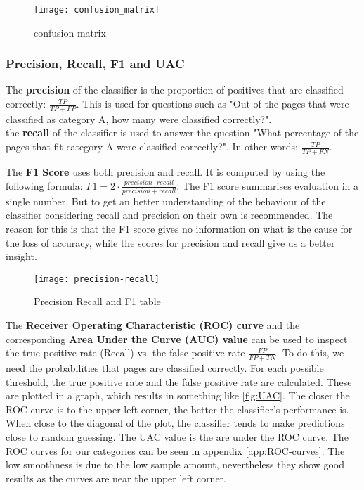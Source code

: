 \begin{figure}[ht]
\centering
\texttt{[image: confusion\_matrix]}
\caption{confusion matrix \protect\footnotemark{}}
\label{fig:confusion_matrix}
\end{figure}

\subsubsection{Precision, Recall, F1 and UAC}\label{sec:classification-validation}
The \textbf{precision} of the classifier is the proportion of positives that are classified correctly: $\frac{TP}{TP+FP}$. This is used for questions such as "Out of the pages that were classified as category A, how many were classified correctly?".\\

the \textbf{recall} of the classifier is used to answer the question "What percentage of the pages that fit category A were classified correctly?". In other words: $\frac{TP}{TP+FN}$.

The \textbf{F1 Score} uses both precision and recall. It is computed by using the following formula: $F1 = 2\cdot \frac{precision \cdot recall}{precision + recall}$. The F1 score summarises evaluation in a single number. But to get an better understanding of the behaviour of the classifier considering recall and precision on their own is recommended. The reason for this is that the F1 score gives no information on what is the cause for the loss of accuracy, while the scores for precision and recall give us a better insight.\\

\begin{figure}[ht]
\centering
\texttt{[image: precision-recall]}
\caption{Precision Recall and F1 table}
\label{fig:prec-rec}
\end{figure}

The \textbf{Receiver Operating Characteristic (ROC) curve} and the corresponding \textbf{Area Under the Curve (AUC) value} can be used to inspect the true positive rate (Recall) vs. the false positive rate $\frac{FP}{FP + TN}$. To do this, we need the probabilities that pages are classified correctly. For each possible threshold, the true positive rate and the false positive rate are calculated. These are plotted in a graph, which results in something like \ref{fig:UAC}. The closer the ROC curve is to the upper left corner, the better the classifier's performance is. When close to the diagonal of the plot, the classifier tends to make predictions close to random guessing. The UAC value is the are under the ROC curve. The ROC curves for our categories can be seen in appendix \ref{app:ROC-curves}. The low smoothness is due to the low sample amount, nevertheless they show good results as the curves are near the upper left corner.


